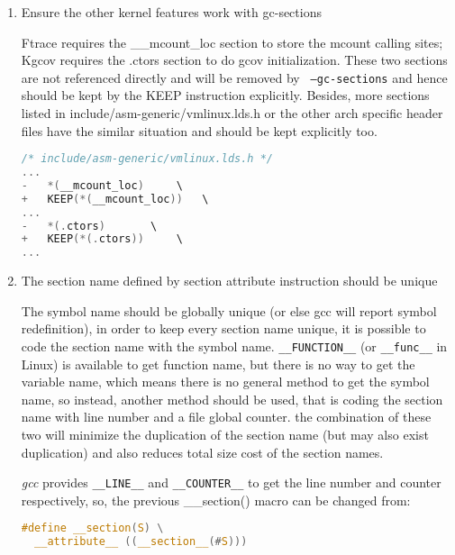\documentclass[10pt,a4paper]{article}
\begin{document}
\begin{multicols}{2}
\begin{enumerate}

\item Ensure the other kernel features work with gc-sections

Ftrace requires the \_\_mcount\_loc section to store the mcount calling
sites; Kgcov requires the .ctors section to do gcov initialization. These two
sections are not referenced directly and will be removed by {\small {\tt
--gc-sections}} and hence should be kept by the KEEP instruction explicitly.
Besides, more sections listed in include/asm-generic/vmlinux.lds.h or the other
arch specific header files have the similar situation and should be kept
explicitly too.

\begin{lstlisting}[language=c,
                  commentstyle=\fontsize{7}{8}\selectfont,
                  basicstyle=\ttfamily\fontsize{7}{8}\selectfont]
/* include/asm-generic/vmlinux.lds.h */
...
-	*(__mcount_loc)		\
+	KEEP(*(__mcount_loc))	\
...
-	*(.ctors)		\
+	KEEP(*(.ctors))		\
...
\end{lstlisting}

\item The section name defined by section attribute instruction should be
unique

The symbol name should be globally unique (or else gcc will report symbol
redefinition), in order to keep every section name unique, it is possible to
code the section name with the symbol name. {\small {\tt \_\_FUNCTION\_\_}} (or
{\small {\tt \_\_func\_\_}} in Linux) is available to get function name, but
there is no way to get the variable name, which means there is no general
method to get the symbol name, so instead, another method should be used, that
is coding the section name with line number and a file global counter. the
combination of these two will minimize the duplication of the section name (but
may also exist duplication) and also reduces total size cost of the section
names.

{\em gcc} provides {\small {\tt \_\_LINE\_\_}} and {\small \tt{\_\_COUNTER\_\_}} to
get the line number and counter respectively, so, the previous \_\_section()
macro can be changed from:

\begin{lstlisting}[language=c,
                  commentstyle=\fontsize{7}{8}\selectfont,
                  basicstyle=\ttfamily\fontsize{7}{8}\selectfont]
#define __section(S) \
  __attribute__ ((__section__(#S)))
\end{lstlisting}


\end{enumerate}
\end{multicols}
\end{document}
